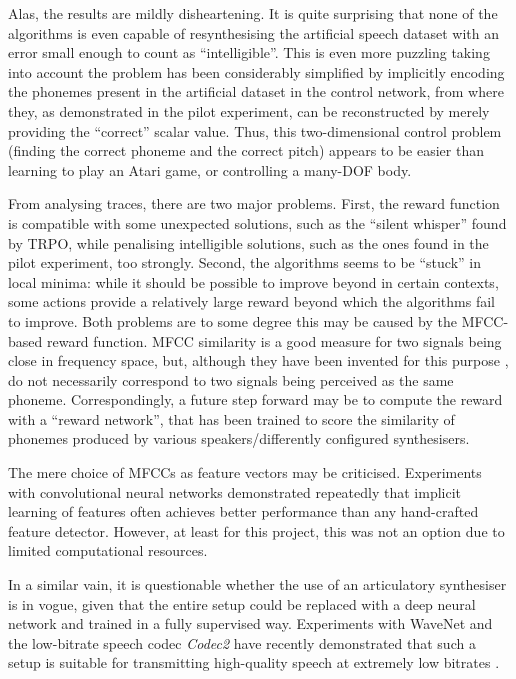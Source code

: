 \documentclass[letterpaper,10pt,conference]{ieeeconf}
\begin{document}
Alas, the results are mildly disheartening. It is quite surprising that none of the algorithms is even capable of resynthesising the artificial speech dataset with an error small enough to count as \enquote{intelligible}. This is even more puzzling taking into account the problem has been considerably simplified by implicitly encoding the phonemes present in the artificial dataset in the control network, from where they, as demonstrated in the pilot experiment, can be reconstructed by merely providing the \enquote{correct} scalar value. Thus, this two-dimensional control problem (finding the correct phoneme and the correct pitch) appears to be easier than learning to play an Atari game, or controlling a many-DOF body.

From analysing traces, there are two major problems. First, the reward function is compatible with some unexpected solutions, such as the \enquote{silent whisper} found by TRPO, while penalising intelligible solutions, such as the ones found in the pilot experiment, too strongly. Second, the algorithms seems to be \enquote{stuck} in local minima: while it should be possible to improve beyond  in certain contexts, some actions provide a relatively large reward beyond which the algorithms fail to improve. Both problems are to some degree this may be caused by the MFCC-based reward function. MFCC similarity is a good measure for two signals being close in frequency space, but, although they have been invented for this purpose \cite{mermelstein1976distance}, do not necessarily correspond to two signals being perceived as the same phoneme. Correspondingly, a future step forward may be to compute the reward with a \enquote{reward network}, that has been trained to score the similarity of phonemes produced by various speakers/differently configured synthesisers.

The mere choice of MFCCs as feature vectors may be criticised. Experiments with convolutional neural networks demonstrated repeatedly that implicit learning of features often achieves better performance than any hand-crafted feature detector. However, at least for this project, this was not an option due to limited computational resources.

In a similar vain, it is questionable whether the use of an articulatory synthesiser is in vogue, given that the entire setup could be replaced with a deep neural network and trained in a fully supervised way. Experiments with WaveNet and the low-bitrate speech codec \emph{Codec2} have recently demonstrated that such a setup is suitable for transmitting high-quality speech at extremely low bitrates \cite{bastiaankleijn2017wavenet}.
\end{document}
